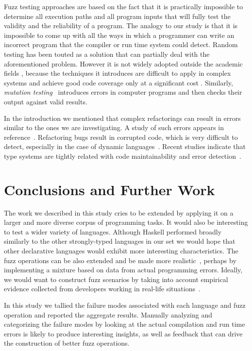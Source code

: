 \documentclass[10pt]{sigplanconf}
\begin{document}
Fuzz testing approaches are based on the fact that it is practically
impossible to determine all execution paths and all program inputs that will
fully test the validity and the reliability of a program.
The analogy to our study is that it is impossible to come up with all
the ways in which a programmer can write an incorrect program that the
compiler or run time system could detect.
Random testing \cite{HAM06} has been touted as a solution that can partially
deal with the aforementioned problem.
However it is not widely adopted outside the academic fields \cite{GGBO07},
because the techniques it introduces are difficult to apply
in complex systems and achieve good code coverage only at a significant cost
\cite{RAWO06}.
Similarly, {\em mutation testing}~\cite{JIHA10}
introduces errors in computer programs and then checks their
output against valid results.

In the introduction we mentioned that complex refactorings can
result in errors similar to the ones we are investigating.
A study of such errors appears in reference~\cite{DDGM07}.
Refactoring bugs result in corrupted code,
which is very difficult to detect, especially in the case of dynamic
languages~\cite{FFM11,SCHA12}.
Recent studies indicate that type systems are tightly related with
code maintainability and error detection~\cite{STHA11,KHRT12}.

\section{Conclusions and Further Work} %
\label{sec:conclusions}

The work we described in this study cries to be extended
by applying it on a larger and more diverse corpus of programming tasks.
It would also be interesting to test a wider variety of languages.
Although Haskell performed broadly similarly to the other strongly-typed
languages in our set we would hope that other declarative languages
would exhibit more interesting characteristics.
The fuzz operations can be also extended
and be made more realistic~\cite{LFGC07},
perhaps by implementing a mixture based on data from actual programming
errors.
Ideally, we would want to construct fuzz scenarios by taking
into account empirical evidence collected from developers working
in real-life situations~\cite{HANE10}.

In this study we tallied the failure modes associated with each
language and fuzz operation and reported the aggregate results.
Manually analyzing and categorizing the failure modes by looking
at the actual compilation and run time errors
is likely to produce interesting insights,
as well as feedback that can drive the
construction of better fuzz operations.
\end{document}
